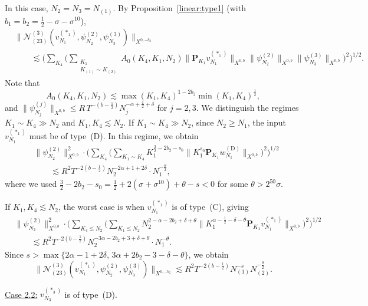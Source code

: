 \documentclass[11pt,reqno,english]{amsart}
\numberwithin{equation}{section}
\theoremstyle{plain}
\theoremstyle{definition}
\theoremstyle{remark}
\begin{document}
In this case, $N_2=N_3=N_{(1)}$.
By Proposition~\ref{linear:type1} (with $b_1=b_2=\frac{1}{2}-\sigma-\sigma^{10}$),
\begin{align*}
	&\|\mathcal{N}_{(23)}^{(3)}(v_{N_1}^{(\ast_1)},\psi_{N_2}^{(2)},\psi_{N_3}^{(3)})\|_{X^{0,-b_2}}\\
	&\qquad\lesssim
	\Big(\sum_{K_4}
	\Big(\sum_{\substack{K_1\\
			K_{(1)}\sim K_{(2)}
	}}
	A_0(K_4,K_1,N_2)\|\mathbf{P}_{K_1}v_{N_1}^{(\ast_1)}\|_{X^{0,b}}\|\psi_{N_2}^{(2)}\|_{X^{0,b}}\|\psi_{N_3}^{(3)}\|_{X^{0,b}}
	\Big)^2
	\Big)^{1/2}.
\end{align*}
Note that
\[
A_0(K_4,K_1,N_2)\lesssim \max(K_1,K_4)^{1-2b_2}\min(K_1,K_4)^{\frac{1}{2}},
\]
and $\|\psi_{N_j}^{(j)}\|_{X^{0,b}}\leq R\, T^{-(b-\frac{1}{2})}N_j^{-\alpha+\frac{1}{2}+\delta}$ for $j=2,3$.
We distinguish the regimes $K_1\sim K_4\gg N_2$ and $K_1,K_4\lesssim N_2$. If $K_1\sim K_4\gg N_2$, since $N_2\geq N_1$, the input $v_{N_1}^{(\ast_1)}$ must be of type~(D). In this regime, we obtain
\begin{align*}
	&\|\psi_{N_2}^{(2)}\|_{X^{0,b}}^2\cdot \Big(\sum_{K_4}
	\Big(
	\sum_{K_1\sim K_4} K_1^{\frac{3}{2}-2b_2-s_0}\|K_1^{s_0}\mathbf{P}_{K_1}w_{N_1}^{(\mathrm{D})}\|_{X^{0,b}}
	\Big)^2
	\Big)^{1/2}\\
	&\qquad\lesssim R^2 T^{-2(b-\frac{1}{2})}N_2^{-2\alpha+1+2\delta}\cdot N_1^{-\frac{\theta}{2}},
\end{align*}
where we used $\frac{3}{2}-2b_2-s_0=\frac{1}{2}+2(\sigma+\sigma^{10})+\theta-s<0$ for some $\theta>2^{50}\sigma$.


If $K_1,K_4\lesssim N_2$, the worst case is when $v_{N_1}^{(\ast_1)}$ is of type~(C), giving
\begin{align*}
	&\|\psi_{N_2}^{(2)}\|_{X^{0,b}}^2\cdot \Big(\sum_{K_4\lesssim N_2}
	\Big(
	\sum_{K_1\lesssim N_2}
	N_2^{2-\alpha-2b_2+\delta+\theta} \|K_1^{\alpha-\frac{1}{2}-\delta-\theta}\mathbf{P}_{K_1}v_{N_1}^{(\ast_1)}\|_{X^{0,b}}
	\Big)^{2}
	\Big)^{1/2}\\
	&\qquad\lesssim R^2 T^{-2(b-\frac{1}{2})}N_2^{-3\alpha-2b_2+3+\delta+\theta}\cdot N_1^{-\theta}.
\end{align*}
Since $s>\max\{2\alpha-1+2\delta,\, 3\alpha+2b_2-3-\delta-\theta\}$, we obtain
\[
\|\mathcal{N}_{(23)}^{(3)}(v_{N_1}^{(\ast_1)},\psi_{N_2}^{(2)},\psi_{N_3}^{(3)})\|_{X^{0,-b_2}}\lesssim R^2 T^{-2(b-\frac{1}{2})}N_{(1)}^{-s}N_{(2)}^{-\frac{\theta}{2}}.
\]

\underline{Case 2.2:} $v_{N_3}^{(\ast_3)}$ is of type~(D).
\end{document}
